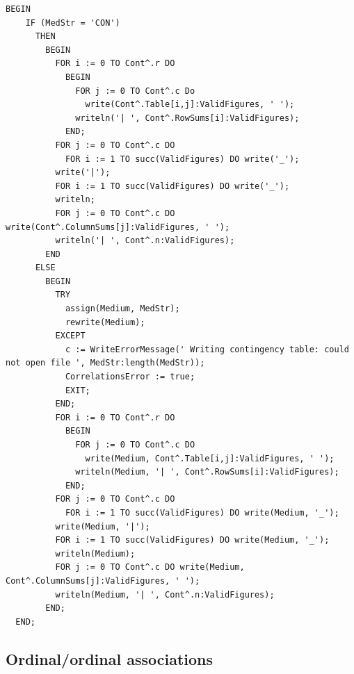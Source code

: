 \begin{refsection}
\begin{lstlisting}[caption=Handling of contingency tables]
  BEGIN
    IF (MedStr = 'CON')
      THEN
        BEGIN
          FOR i := 0 TO Cont^.r DO
            BEGIN
              FOR j := 0 TO Cont^.c Do
                write(Cont^.Table[i,j]:ValidFigures, ' ');
              writeln('| ', Cont^.RowSums[i]:ValidFigures);
            END;
          FOR j := 0 TO Cont^.c DO
            FOR i := 1 TO succ(ValidFigures) DO write('_');
          write('|');
          FOR i := 1 TO succ(ValidFigures) DO write('_');
          writeln;
          FOR j := 0 TO Cont^.c DO write(Cont^.ColumnSums[j]:ValidFigures, ' ');
          writeln('| ', Cont^.n:ValidFigures);
        END
      ELSE
        BEGIN
          TRY
            assign(Medium, MedStr);
            rewrite(Medium);
          EXCEPT
            c := WriteErrorMessage(' Writing contingency table: could not open file ', MedStr:length(MedStr));
            CorrelationsError := true;
            EXIT;
          END;
          FOR i := 0 TO Cont^.r DO
            BEGIN
              FOR j := 0 TO Cont^.c DO
                write(Medium, Cont^.Table[i,j]:ValidFigures, ' ');
              writeln(Medium, '| ', Cont^.RowSums[i]:ValidFigures);
            END;
          FOR j := 0 TO Cont^.c DO
            FOR i := 1 TO succ(ValidFigures) DO write(Medium, '_');
          write(Medium, '|');
          FOR i := 1 TO succ(ValidFigures) DO write(Medium, '_');
          writeln(Medium);
          FOR j := 0 TO Cont^.c DO write(Medium, Cont^.ColumnSums[j]:ValidFigures, ' ');
          writeln(Medium, '| ', Cont^.n:ValidFigures);
        END;
  END;
\end{lstlisting}

\subsection{Ordinal/ordinal associations}


\end{refsection}
